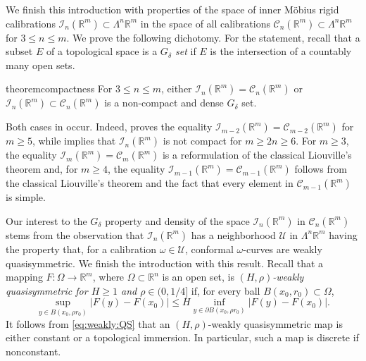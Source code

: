 \documentclass[a4paper,leqno,11pt]{amsart}
\numberwithin{equation}{section}
\theoremstyle{remark}
\theoremstyle{remark}
\newcommand{\R}{\mathbb{R}}
\begin{document}
We finish this introduction with properties of the space of inner Möbius rigid calibrations $\mathcal I_n(\R^m) \subset \Lambda^n \R^m$ in the space of all calibrations $\mathcal{C}_n(\R^m) \subset \Lambda^n \R^m$ for $3 \leq n \leq m$. We prove the following dichotomy. For the statement, recall that a subset $E$ of a topological space is a \emph{$G_\delta$ set} if $E$ is the intersection of a countably many open sets.


\begin{restatable}{theorem}{compactness}
\label{thm:compactnessproperty}
For $3 \leq n \leq m$, either $\mathcal I_n(\R^m) = \mathcal{C}_{n}( \R^m )$ or $\mathcal{I}_n( \R^m ) \subset \mathcal{C}_n( \R^m )$ is a non-compact and dense $G_\delta$ set.
\end{restatable}


Both cases in  occur. Indeed,  proves the equality $\mathcal{I}_{m-2}( \R^m ) = \mathcal{C}_{m-2}( \R^m )$ for $m \geq 5$, while  implies that $\mathcal{I}_{n}( \R^{m} )$ is not compact for $m \geq 2n \geq 6$. For $m \geq 3$, the equality $\mathcal{I}_{m}( \R^m ) = \mathcal{C}_{ m }( \R^m )$ is a reformulation of the classical Liouville's theorem and, for $m \geq 4$, the equality $\mathcal{I}_{m-1}( \R^{m} ) = \mathcal{C}_{ m-1 }( \R^{m} )$ follows from the classical Liouville's theorem and the fact that every element in $\mathcal{C}_{ m-1 }( \R^{m} )$ is simple.



Our interest to the $G_\delta$ property and density of the space $\mathcal I_n(\R^m)$ in $\mathcal{C}_n(\R^m)$ stems from the observation that $\mathcal{I}_n(\R^m)$ has a neighborhood $\mathcal{U}$ in $\Lambda^n \R^m$ having the property that, for a calibration $\omega \in \mathcal U$, conformal $\omega$-curves are weakly quasisymmetric. We finish the introduction with this result. Recall that a mapping $F\colon \Omega \to \R^m$, where $\Omega \subset \R^n$ is an open set, is \emph{$(H,\rho)$-weakly quasisymmetric for $H \geq 1$ and $\rho \in (0,1/4]$} if, for every ball $B( x_0, r_0 ) \subset \Omega$,
\begin{equation}\label{eq:weakly:QS}
    \sup_{ y \in B( x_0, \rho r_0 ) } | F(y) - F(x_0) |
    \leq
    H
    \inf_{ y \in \partial B( x_0, \rho r_0 ) } | F(y) - F( x_0 ) |.
\end{equation}
It follows from \eqref{eq:weakly:QS} that an $( H, \rho )$-weakly quasisymmetric map is either constant or a topological immersion. In particular, such a map is discrete if nonconstant.
\end{document}
